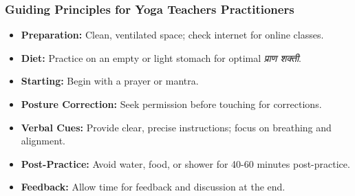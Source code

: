\begin{frame}[fragile]\frametitle{Guiding Principles for Yoga Teachers Practitioners}

	\begin{itemize} 
	\item \textbf{Preparation:} Clean, ventilated space; check internet for online classes. 
	\item \textbf{Diet:} Practice on an empty or light stomach for optimal \textit{प्राण शक्ती}. 
	\item \textbf{Starting:} Begin with a prayer or mantra. 
	\item \textbf{Posture Correction:} Seek permission before touching for corrections. 
	\item \textbf{Verbal Cues:} Provide clear, precise instructions; focus on breathing and alignment. 
	\item \textbf{Post-Practice:} Avoid water, food, or shower for 40-60 minutes post-practice. 
	\item \textbf{Feedback:} Allow time for feedback and discussion at the end. \end{itemize}

\end{frame}

